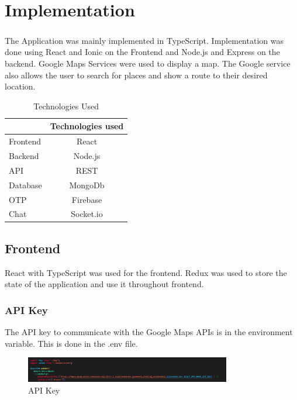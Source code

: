 \chapter{Implementation}

    \paragraph*{}
        The Application was mainly implemented in TypeScript. Implementation was done using React and Ionic on the Frontend and Node.js and Express on the backend. Google Maps Services were used to display a map. The Google service also allows the user to search for places and show a route to their desired location.

        \begin{table}[htb]
            \centering
            \begin{tabular}{ | l | c | }
                \hline
                 & Technologies used \\
                \hline
                \hline
                Frontend & React \\ 
                \hline
                Backend & Node.js \\
                \hline
                API & REST\\
                \hline
                Database & MongoDb\\
                \hline
                OTP & Firebase  \\
                \hline
                Chat & Socket.io \\
                \hline
            \end{tabular}
            \caption{Technologies Used}
            \label{tab:Technologies}
        \end{table}


    \section{Frontend}

    React with TypeScript was used for the frontend. Redux was used to store the state of the application and use it throughout frontend.
        
    \subsection{API Key}
    The API key to communicate with the Google Maps APIs is in the environment variable. This is done in the .env file.
        \begin{figure}[h]
            \centering
            \includegraphics[width=0.8\textwidth]{images/APIkey.png}
            \caption{API Key}
            \label{fig:API}
        \end{figure}

